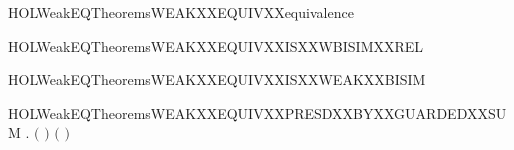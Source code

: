 \newcommand{\HOLWeakEQTheoremsWEAKXXEQUIVXXEPSYY}{\UseVerbatim{HOLWeakEQTheoremsWEAKXXEQUIVXXEPSYY}}
\begin{SaveVerbatim}{HOLWeakEQTheoremsWEAKXXEQUIVXXequivalence}
\HOLTokenTurnstile{}  
\end{SaveVerbatim}
\newcommand{\HOLWeakEQTheoremsWEAKXXEQUIVXXequivalence}{\UseVerbatim{HOLWeakEQTheoremsWEAKXXEQUIVXXequivalence}}
\begin{SaveVerbatim}{HOLWeakEQTheoremsWEAKXXEQUIVXXISXXWBISIMXXREL}
\HOLTokenTurnstile{}  \HOLSymConst{\ensuremath{=}}   \HOLConst{\ensuremath{\tau}}
\end{SaveVerbatim}
\newcommand{\HOLWeakEQTheoremsWEAKXXEQUIVXXISXXWBISIMXXREL}{\UseVerbatim{HOLWeakEQTheoremsWEAKXXEQUIVXXISXXWBISIMXXREL}}
\begin{SaveVerbatim}{HOLWeakEQTheoremsWEAKXXEQUIVXXISXXWEAKXXBISIM}
\HOLTokenTurnstile{}  
\end{SaveVerbatim}
\newcommand{\HOLWeakEQTheoremsWEAKXXEQUIVXXISXXWEAKXXBISIM}{\UseVerbatim{HOLWeakEQTheoremsWEAKXXEQUIVXXISXXWEAKXXBISIM}}
\begin{SaveVerbatim}{HOLWeakEQTheoremsWEAKXXEQUIVXXPRESDXXBYXXGUARDEDXXSUM}
\HOLTokenTurnstile{} \HOLSymConst{\HOLTokenForall{}}     .
          \HOLSymConst{\HOLTokenConj{}}    \HOLSymConst{\HOLTokenImp{}}
        \ensuremath{(}\HOLSymConst{\ensuremath{\ldotp}} \HOLSymConst{\ensuremath{+}} \HOLSymConst{\ensuremath{\ldotp}}\ensuremath{)} \ensuremath{(}\HOLSymConst{\ensuremath{\ldotp}} \HOLSymConst{\ensuremath{+}} \HOLSymConst{\ensuremath{\ldotp}}\ensuremath{)}
\end{SaveVerbatim}
\newcommand{\HOLWeakEQTheoremsWEAKXXEQUIVXXPRESDXXBYXXGUARDEDXXSUM}{\UseVerbatim{HOLWeakEQTheoremsWEAKXXEQUIVXXPRESDXXBYXXGUARDEDXXSUM}}
